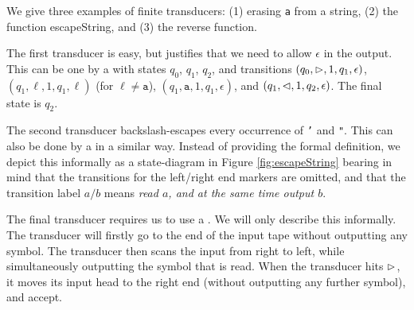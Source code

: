 \begin{example}
    We give three examples of finite transducers: (1) erasing \texttt{a} from
    a string, (2) the function escapeString, and (3) the reverse function.

    The first transducer is easy, but justifies that we need to allow $\epsilon$
    in the output. This can be one by a \FT{} with states $q_0$, $q_1$,
    $q_2$, and transitions $(q_0,\vartriangleright,1,q_1,\epsilon)$,
    $(q_1,\ell,1,q_1,\ell)$ (for $\ell \neq \texttt{a}$), 
    $(q_1,\texttt{a},1,q_1,\epsilon)$, and
    $(q_1,\vartriangleleft,1,q_2,\epsilon)$. The final state is $q_2$.

    The second transducer backslash-escapes every occurrence of \texttt{'} and 
    \texttt{"}. This can also be done by a \FT{} in a similar way. Instead of
    providing the formal definition, we depict this informally as a 
    state-diagram in Figure
    \ref{fig:escapeString} bearing in mind that the transitions for the
    left/right end markers are omitted, and that the transition label
    $a/b$ means \emph{read $a$, and at the same time output $b$}.



    The final transducer requires us to use a \FFT{}. We will only describe
    this informally. The transducer will firstly go to the end of the input tape
    without outputting any symbol. The transducer then scans the input from
    right to left, while simultaneously outputting the symbol that is read.
    When the transducer hits $\vartriangleright$, it moves its input head to the right
    end (without outputting any further symbol), and accept.
\end{example}


